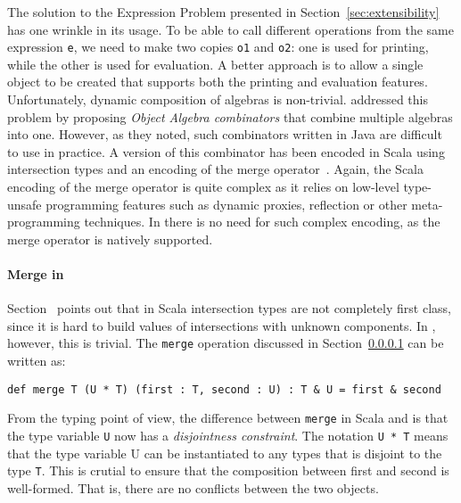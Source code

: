 The solution to the Expression Problem presented in
Section~\ref{sec:extensibility} has one wrinkle in its usage. To be able to call
different operations from the same expression \lstinline{e}, we need to make two
copies \lstinline{o1} and \lstinline{o2}: one is used for printing, while the
other is used for evaluation. A better approach is to allow a single object
to be created that supports both the printing and evaluation features.
Unfortunately, dynamic composition of algebras is non-trivial.
\citet{oliveira2012extensibility} addressed this problem by proposing
\textit{Object Algebra combinators} that combine multiple algebras into one.
However, as they noted, such combinators written in Java are difficult to use in
practice. A version of this combinator has been encoded in Scala using
intersection types and an encoding of the merge
operator~\cite{oliveira2013feature, rendel14attributes}. Again, the Scala
encoding of the merge operator is quite complex as it relies on low-level
type-unsafe programming features such as dynamic proxies, reflection or other
meta-programming techniques. In \name there is no need for such complex
encoding, as the merge operator is natively supported.

\paragraph{Merge in \name} Section~\cite{} points out that in Scala 
intersection types are not completely first class, since it is hard to 
build values of intersections with unknown components. In \name,
however, this is trivial. The \lstinline{merge} operation discussed 
in Section~\ref{} can be written as:
   
\begin{lstlisting}
def merge T (U * T) (first : T, second : U) : T & U = first & second 
\end{lstlisting}

\noindent From the typing point of view, the difference between
\lstinline{merge} in Scala and \name is that the type variable
\lstinline{U} now has a \emph{disjointness constraint}. The notation
\lstinline{U * T} means that the type variable U can be instantiated
to any types that is disjoint to the type \lstinline{T}. This is
crutial to ensure that the composition between first and second 
is well-formed. That is, there are no conflicts between the two objects. 

